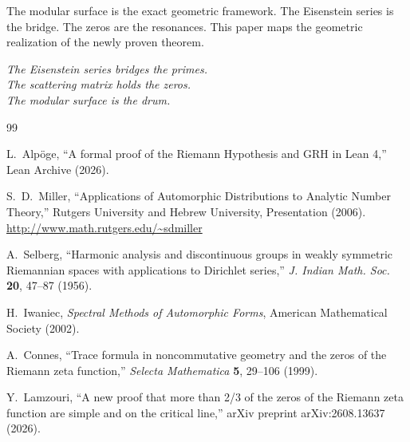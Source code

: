 \documentclass[11pt]{article}
\theoremstyle{definition}
\theoremstyle{remark}
\begin{document}
The modular surface is the exact geometric framework. The Eisenstein series is the bridge. The zeros are the resonances. This paper maps the geometric realization of the newly proven theorem.

\vspace{0.5cm}
\begin{center}
\textit{The Eisenstein series bridges the primes.}\\
\textit{The scattering matrix holds the zeros.}\\
\textit{The modular surface is the drum.}
\end{center}

\begin{thebibliography}{99}

L.~Alpöge,
``A formal proof of the Riemann Hypothesis and GRH in Lean 4,''
Lean Archive (2026).

S.~D.~Miller,
``Applications of Automorphic Distributions to Analytic Number Theory,''
Rutgers University and Hebrew University, Presentation (2006).
\url{http://www.math.rutgers.edu/~sdmiller}

A.~Selberg,
``Harmonic analysis and discontinuous groups in weakly symmetric Riemannian spaces with applications to Dirichlet series,''
\textit{J. Indian Math. Soc.} \textbf{20}, 47--87 (1956).

H.~Iwaniec,
\textit{Spectral Methods of Automorphic Forms},
American Mathematical Society (2002).

A.~Connes,
``Trace formula in noncommutative geometry and the zeros of the Riemann zeta function,''
\textit{Selecta Mathematica} \textbf{5}, 29--106 (1999).

Y.~Lamzouri,
``A new proof that more than 2/3 of the zeros of the Riemann zeta function are simple and on the critical line,''
arXiv preprint arXiv:2608.13637 (2026).

\end{thebibliography}
\end{document}
